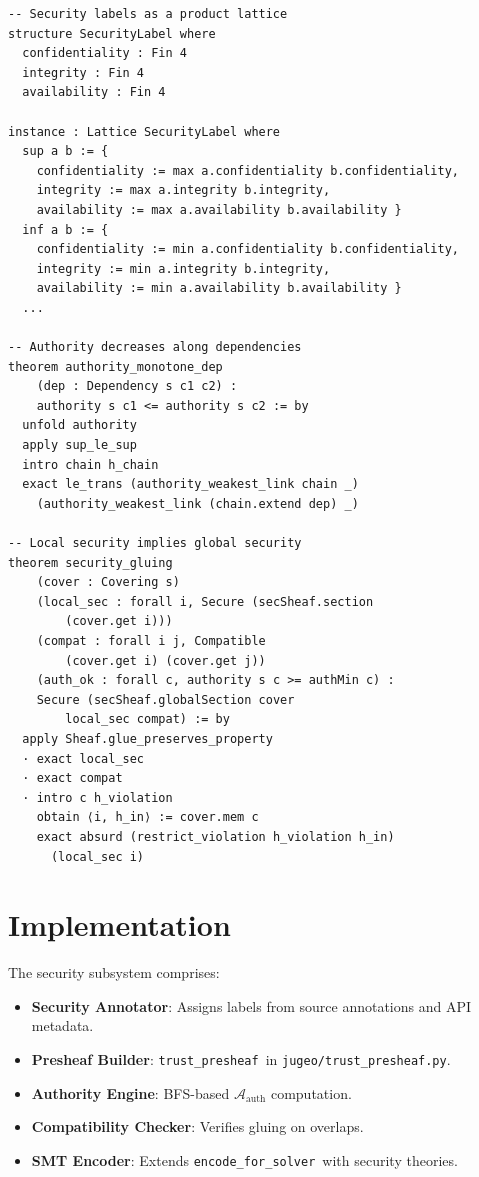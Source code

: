 \documentclass[11pt]{article}
\newcommand{\TrustPresh}{\texttt{trust\_presheaf}}
\newcommand{\EncodeForSolver}{\texttt{encode\_for\_solver}}
\newcommand{\AuthSheaf}{\mathcal{A}_{\mathrm{auth}}}
\begin{document}
\begin{lstlisting}[style=jugeo-output]
-- Security labels as a product lattice
structure SecurityLabel where
  confidentiality : Fin 4
  integrity : Fin 4
  availability : Fin 4

instance : Lattice SecurityLabel where
  sup a b := {
    confidentiality := max a.confidentiality b.confidentiality,
    integrity := max a.integrity b.integrity,
    availability := max a.availability b.availability }
  inf a b := {
    confidentiality := min a.confidentiality b.confidentiality,
    integrity := min a.integrity b.integrity,
    availability := min a.availability b.availability }
  ...

-- Authority decreases along dependencies
theorem authority_monotone_dep
    (dep : Dependency s c1 c2) :
    authority s c1 <= authority s c2 := by
  unfold authority
  apply sup_le_sup
  intro chain h_chain
  exact le_trans (authority_weakest_link chain _)
    (authority_weakest_link (chain.extend dep) _)

-- Local security implies global security
theorem security_gluing
    (cover : Covering s)
    (local_sec : forall i, Secure (secSheaf.section
        (cover.get i)))
    (compat : forall i j, Compatible
        (cover.get i) (cover.get j))
    (auth_ok : forall c, authority s c >= authMin c) :
    Secure (secSheaf.globalSection cover
        local_sec compat) := by
  apply Sheaf.glue_preserves_property
  · exact local_sec
  · exact compat
  · intro c h_violation
    obtain ⟨i, h_in⟩ := cover.mem c
    exact absurd (restrict_violation h_violation h_in)
      (local_sec i)
\end{lstlisting}

\section{Implementation}\label{sec:implementation}

The security subsystem comprises:
\begin{itemize}[noitemsep]
  \item \textbf{Security Annotator}: Assigns labels from source
        annotations and API metadata.
  \item \textbf{Presheaf Builder}: \TrustPresh\ in
        \texttt{jugeo/trust\_presheaf.py}.
  \item \textbf{Authority Engine}: BFS-based $\AuthSheaf$ computation.
  \item \textbf{Compatibility Checker}: Verifies gluing on overlaps.
  \item \textbf{SMT Encoder}: Extends \EncodeForSolver\ with security
        theories.
\end{itemize}
\end{document}
